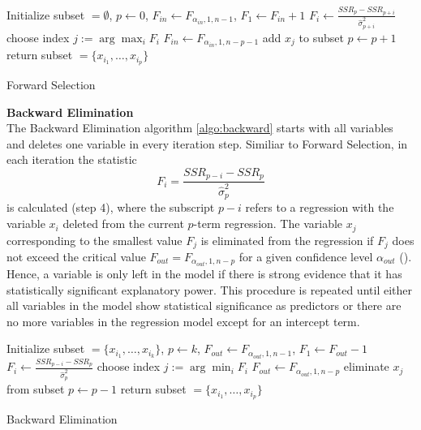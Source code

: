 \documentclass[a4paper, 12pt]{scrreprt}
\begin{document}
\begin{algorithm} 
	
	Initialize subset $= \emptyset$, $p \gets 0$, $F_{in} \gets F_{\alpha_{in},1,n-1} $, $F_1 \gets F_{in} +1$\;
	{
		{
			$F_i \gets \frac{SSR_p - SSR_{p+i}}{\hat{\sigma}_{p+i}^2}$\;
		}
		choose index $j := \arg\max_i F_i$\;
		$F_{in} \gets F_{\alpha_{in},1,n-p-1}$\;
		{
			add $x_j$ to subset\;
			$p \gets p+1$\;
		}
	}
	return subset $= \{ x_{i_1}, \ldots, x_{i_p} \}$
	\caption{Forward Selection}
	\label{algo:forward}
\end{algorithm}

\bigskip 
\textbf{Backward Elimination} \\
The Backward Elimination algorithm \ref{algo:backward} starts with all variables and deletes one variable in every iteration step. Similiar to Forward Selection, in each iteration the statistic
\begin{equation}
F_i = \frac{SSR_{p-i} - SSR_p}{\hat{\sigma}_{p}^2}
\end{equation}
is calculated (step 4), where the subscript $p-i$ refers to a regression with the variable $x_i$ deleted from the current $p$-term regression. 
The variable $x_j$ corresponding to the smallest value $F_j$ is eliminated from the regression if $F_j$ does not exceed the critical value $F_{out} = F_{\alpha_{out},1,n-p}$ for a given confidence level $\alpha_{out}$
(\textcite[chapter 4.6]{hocking1976biometrics}).
Hence, a variable is only left in the model if there is strong evidence that it has statistically significant explanatory power. 
This procedure is repeated until either all variables in the model show statistical significance as predictors or there are no more variables in the regression model except for an intercept term.

\begin{algorithm}
	
	Initialize subset $= \{ x_{i_1},\ldots, x_{i_k} \}$, $p \gets k$, $F_{out} \gets F_{\alpha_{out},1,n-1}$, $F_1 \gets F_{out} -1$\;
	{
		{
			$F_i \gets \frac{SSR_{p-i} - SSR_p}{\hat{\sigma}_{p}^2}$\;
		}
		choose index $j := \arg\min_i F_i$\;
		$F_{out} \gets F_{\alpha_{out},1,n-p}$\;
		{
			eliminate $x_j$ from subset\;
			$p \gets p-1$\;
		}
	}
	return subset $= \{ x_{i_1}, \ldots, x_{i_p} \}$
	\caption{Backward Elimination}
	\label{algo:backward}
\end{algorithm}
\end{document}
